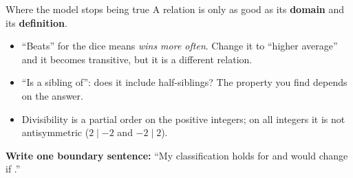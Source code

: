 \documentclass[aspectratio=169,10pt]{beamer}
\begin{document}
\begin{frame}{Where the model stops being true}
A relation is only as good as its \textbf{domain} and its \textbf{definition}.
\begin{itemize}
\item ``Beats'' for the dice means \emph{wins more often}. Change it to ``higher average'' and it becomes transitive, but it is a different relation.
\item ``Is a sibling of'': does it include half-siblings? The property you find depends on the answer.
\item Divisibility is a partial order on the positive integers; on all integers it is not antisymmetric ($2\mid -2$ and $-2\mid 2$).
\end{itemize}
\textbf{Write one boundary sentence:} ``My classification holds for \underline{\hspace{2cm}} and would change if \underline{\hspace{2cm}}.''
\end{frame}
\end{document}
